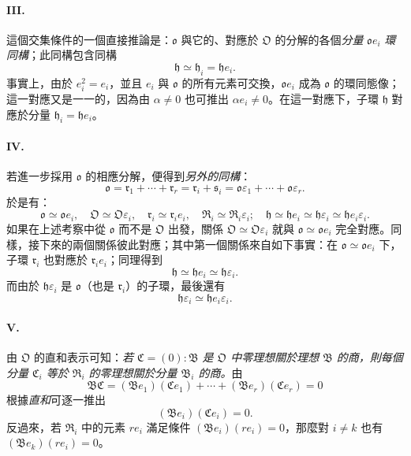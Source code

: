 \documentclass[11pt]{article}
\begin{document}
\paragraph{III.}
這個交集條件的一個直接推論是：$\mathfrak o$ 與它的、對應於 $\mathfrak O$ 的分解的各個\emph{分量} $\mathfrak o e_i$ \emph{環同構}；此同構包含同構
\[
\mathfrak h\simeq\mathfrak h_i=\mathfrak h e_i.
\]
事實上，由於 $e_i^2=e_i$，並且 $e_i$ 與 $\mathfrak o$ 的所有元素可交換，$\mathfrak o e_i$ 成為 $\mathfrak o$ 的環同態像；這一對應又是一一的，因為由 $\alpha\ne0$ 也可推出 $\alpha e_i\ne0$。在這一對應下，子環 $\mathfrak h$ 對應於分量 $\mathfrak h_i=\mathfrak h e_i$。

\paragraph{IV.}
若進一步採用 $\mathfrak o$ 的相應分解，便得到\emph{另外的同構}：
\[
\mathfrak o=\mathfrak r_1+\cdots+\mathfrak r_r
=\mathfrak r_i+\mathfrak s_i
=\mathfrak o\varepsilon_1+\cdots+\mathfrak o\varepsilon_r.
\]
於是有：
\[
\mathfrak o\simeq\mathfrak o e_i,
\quad \mathfrak O\simeq\mathfrak O\varepsilon_i,
\quad \mathfrak r_i\simeq\mathfrak r_i e_i,
\quad \mathfrak R_i\simeq\mathfrak R_i\varepsilon_i;
\quad \mathfrak h\simeq\mathfrak h e_i\simeq\mathfrak h\varepsilon_i\simeq\mathfrak h e_i\varepsilon_i.
\]
如果在上述考察中從 $\mathfrak o$ 而不是 $\mathfrak O$ 出發，關係 $\mathfrak O\simeq\mathfrak O\varepsilon_i$ 就與 $\mathfrak o\simeq\mathfrak o e_i$ 完全對應。同樣，接下來的兩個關係彼此對應；其中第一個關係來自如下事實：在 $\mathfrak o\simeq\mathfrak o e_i$ 下，子環 $\mathfrak r_i$ 也對應於 $\mathfrak r_i e_i$；同理得到
\[
\mathfrak h\simeq\mathfrak h e_i\simeq\mathfrak h\varepsilon_i.
\]
而由於 $\mathfrak h\varepsilon_i$ 是 $\mathfrak o$（也是 $\mathfrak r_i$）的子環，最後還有
\[
\mathfrak h\varepsilon_i\simeq\mathfrak h e_i\varepsilon_i.
\]

\paragraph{V.}
由 $\mathfrak O$ 的直和表示可知：\emph{若 $\mathfrak C=(0):\mathfrak B$ 是 $\mathfrak O$ 中零理想關於理想 $\mathfrak B$ 的商，則每個分量 $\mathfrak C_i$ 等於 $\mathfrak R_i$ 的零理想關於分量 $\mathfrak B_i$ 的商。}由
\[
\mathfrak B\mathfrak C=(\mathfrak B e_1)(\mathfrak C e_1)+\cdots+(\mathfrak B e_r)(\mathfrak C e_r)=0
\]
根據\emph{直和}可逐一推出
\[
(\mathfrak B e_i)(\mathfrak C e_i)=0.
\]
反過來，若 $\mathfrak R_i$ 中的元素 $r e_i$ 滿足條件 $(\mathfrak B e_i)(r e_i)=0$，那麼對 $i\ne k$ 也有 $(\mathfrak B e_k)(r e_i)=0$。
\end{document}
